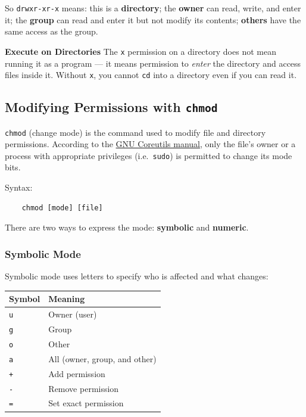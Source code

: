 \documentclass{article}
\newcommand{\code}[1]{\colorbox{codebg}{\texttt{#1}}}
\begin{document}
\noindent So \code{drwxr-xr-x} means: this is a \textbf{directory}; the
\textbf{owner} can read, write, and enter it; the \textbf{group} can read and
enter it but not modify its contents; \textbf{others} have the same access as
the group.

\begin{callout}{\textbf{Execute on Directories}}
	The \code{x} permission on a directory does not mean running it as a program
	--- it means permission to \textit{enter} the directory and access files inside
	it. Without \code{x}, you cannot \code{cd} into a directory even if you can
	read it.
\end{callout}

\subsection{Modifying Permissions with \code{chmod}}

\code{chmod} (change mode) is the command used to modify file and directory
permissions. According to the
\href{https://www.gnu.org/software/coreutils/chmod}{GNU Coreutils manual}, only
the file's owner or a process with appropriate privileges (i.e.\ \code{sudo}) is
permitted to change its mode bits.

Syntax:

\begin{verbatim}
	chmod [mode] [file]
\end{verbatim}

There are two ways to express the mode: \textbf{symbolic} and \textbf{numeric}.

\subsubsection{Symbolic Mode}

Symbolic mode uses letters to specify who is affected and what changes:

\begin{center}
	{\renewcommand{\arraystretch}{1.25}
		\begin{tabular}{@{}ll@{}}
			\toprule
			\textbf{Symbol} & \textbf{Meaning} \\
			\midrule
			\code{u} & Owner (user) \\
			\code{g} & Group \\
			\code{o} & Other \\
			\code{a} & All (owner, group, and other) \\
			\midrule
			\code{+} & Add permission \\
			\code{-} & Remove permission \\
			\code{=} & Set exact permission \\
			\bottomrule
	\end{tabular}}
\end{center}
\end{document}
